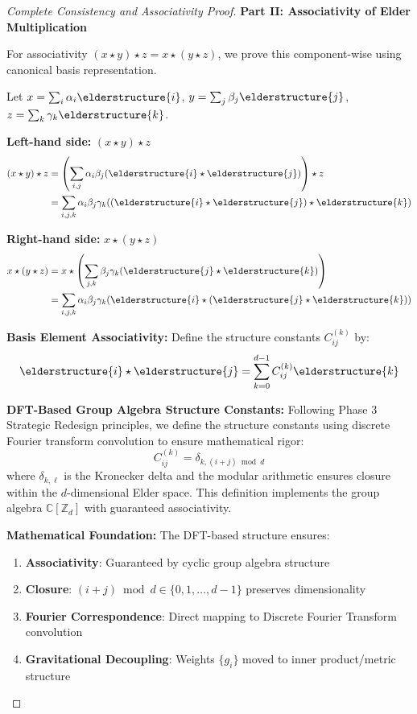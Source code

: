 \begin{proof}[Complete Consistency and Associativity Proof]
\textbf{Part II: Associativity of Elder Multiplication}

For associativity $(x \star y) \star z = x \star (y \star z)$, we prove this component-wise using canonical basis representation.

Let $x = \sum_{i} \alpha_i \elderstructure{i}$, $y = \sum_{j} \beta_j \elderstructure{j}$, $z = \sum_{k} \gamma_k \elderstructure{k}$.

\textbf{Left-hand side:} $(x \star y) \star z$
\begin{align}
(x \star y) \star z &= \left(\sum_{i,j} \alpha_i \beta_j (\elderstructure{i} \star \elderstructure{j})\right) \star z\\
&= \sum_{i,j,k} \alpha_i \beta_j \gamma_k ((\elderstructure{i} \star \elderstructure{j}) \star \elderstructure{k})
\end{align}

\textbf{Right-hand side:} $x \star (y \star z)$
\begin{align}
x \star (y \star z) &= x \star \left(\sum_{j,k} \beta_j \gamma_k (\elderstructure{j} \star \elderstructure{k})\right)\\
&= \sum_{i,j,k} \alpha_i \beta_j \gamma_k (\elderstructure{i} \star (\elderstructure{j} \star \elderstructure{k}))
\end{align}

\textbf{Basis Element Associativity:} Define the structure constants $C_{ij}^{(k)}$ by:
$$\elderstructure{i} \star \elderstructure{j} = \sum_{k=0}^{d-1} C_{ij}^{(k)} \elderstructure{k}$$

\textbf{DFT-Based Group Algebra Structure Constants:} Following Phase 3 Strategic Redesign principles, we define the structure constants using discrete Fourier transform convolution to ensure mathematical rigor:
$$C_{ij}^{(k)} = \delta_{k, (i+j) \bmod d}$$
where $\delta_{k,\ell}$ is the Kronecker delta and the modular arithmetic ensures closure within the $d$-dimensional Elder space. This definition implements the group algebra $\mathbb{C}[\mathbb{Z}_d]$ with guaranteed associativity.

\textbf{Mathematical Foundation:} The DFT-based structure ensures:
\begin{enumerate}
    \item \textbf{Associativity}: Guaranteed by cyclic group algebra structure
    \item \textbf{Closure}: $(i+j) \bmod d \in \{0,1,\ldots,d-1\}$ preserves dimensionality
    \item \textbf{Fourier Correspondence}: Direct mapping to Discrete Fourier Transform convolution
    \item \textbf{Gravitational Decoupling}: Weights $\{g_i\}$ moved to inner product/metric structure
\end{enumerate}


\end{proof}
